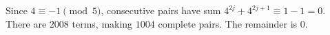 Since $4\equiv-1\pmod5$, consecutive pairs have sum $4^{2j}+4^{2j+1}\equiv1-1=0$. There are $2008$ terms, making $1004$ complete pairs. The remainder is $\boxed0$.
